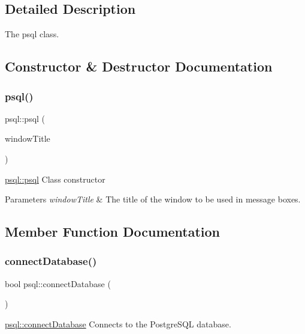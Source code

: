 \subsection{Detailed Description}
The psql class. 

\subsection{Constructor \& Destructor Documentation}
\mbox{\label{classpsql_aaff5fe0931dce097850982e44e6361af}} 
\subsubsection{\texorpdfstring{psql()}{psql()}}
{\footnotesize\ttfamily psql\+::psql (\begin{DoxyParamCaption}\item[{Q\+String}]{window\+Title }\end{DoxyParamCaption})}



\mbox{\hyperlink{classpsql_aaff5fe0931dce097850982e44e6361af}{psql\+::psql}} Class constructor 


\begin{DoxyParams}{Parameters}
{\em window\+Title} & The title of the window to be used in message boxes. \\
\hline
\end{DoxyParams}


\subsection{Member Function Documentation}
\mbox{\label{classpsql_ada485c933df77453629e3821ab19fa4c}} 
\subsubsection{\texorpdfstring{connect\+Database()}{connectDatabase()}}
{\footnotesize\ttfamily bool psql\+::connect\+Database (\begin{DoxyParamCaption}{ }\end{DoxyParamCaption})}



\mbox{\hyperlink{classpsql_ada485c933df77453629e3821ab19fa4c}{psql\+::connect\+Database}} Connects to the Postgre\+S\+QL database. 

